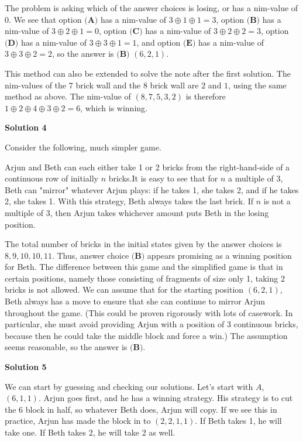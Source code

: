 \begin{enumerate}
 The problem is asking which of the answer choices is losing, or has a nim-value of $0$. We see that option $\textbf{(A)}$ has a nim-value of $3\oplus1\oplus1=3$, option $\textbf{(B)}$ has a nim-value of $3\oplus2\oplus1=0$, option $\textbf{(C)}$ has a nim-value of $3\oplus2\oplus2=3$, option $\textbf{(D)}$ has a nim-value of $3\oplus3\oplus1=1$, and option $\textbf{(E)}$ has a nim-value of $3\oplus3\oplus2=2$, so the answer is $\boxed{\textbf{(B) }(6, 2, 1)}$.

 This method can also be extended to solve the note after the first solution. The nim-values of the $7$ brick wall and the $8$ brick wall are $2$ and $1$, using the same method as above. The nim-value of $(8, 7, 5, 3, 2)$ is therefore $1\oplus2\oplus4\oplus3\oplus2 = 6$, which is winning.

 



\textbf{Solution 4}

Consider the following, much simpler game.

 Arjun and Beth can each either take 1 or 2 bricks from the right-hand-side of a continuous row of initially $n$ bricks.It is easy to see that for $n$ a multiple of 3, Beth can "mirror" whatever Arjun plays: if he takes 1, she takes 2, and if he takes 2, she takes 1. With this strategy, Beth always takes the last brick. If $n$ is not a multiple of 3, then Arjun takes whichever amount puts Beth in the losing position.

 The total number of bricks in the initial states given by the answer choices is $8, 9, 10, 10, 11$. Thus, answer choice $\textbf{(B)}$ appears promising as a winning position for Beth. The difference between this game and the simplified game is that in certain positions, namely those consisting of fragments of size only 1, taking 2 bricks is not allowed. We can assume that for the starting position $(6, 2, 1)$, Beth always has a move to ensure that she can continue to mirror Arjun throughout the game. (This could be proven rigorously with lots of casework. In particular, she must avoid providing Arjun with a position of 3 continuous bricks, because then he could take the middle block and force a win.) The assumption seems reasonable, so the answer is $\boxed{\textbf{(B)}}$.

 



\textbf{Solution 5}

We can start by guessing and checking our solutions. Let's start with $A$, $(6,1,1)$. Arjun goes first, and he has a winning strategy. His strategy is to cut the 6 block in half, so whatever Beth does, Arjun will copy. If we see this in practice, Arjun has made the block in to $(2,2,1,1)$. If Beth takes 1, he will take one. If Beth takes 2, he will take 2 as well.


\end{enumerate}
